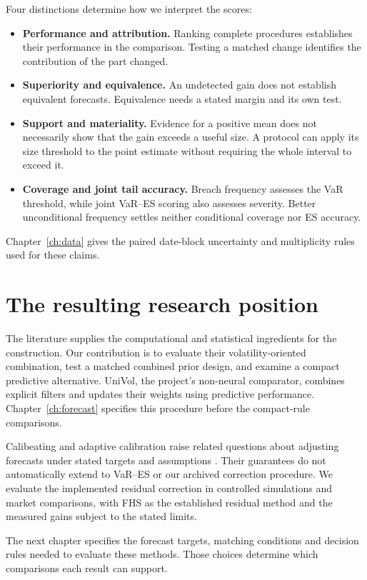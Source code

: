 Four distinctions determine how we interpret the scores:
\begin{itemize}
\item \textbf{Performance and attribution.} Ranking complete procedures establishes their performance in the comparison. Testing a matched change identifies the contribution of the part changed.
\item \textbf{Superiority and equivalence.} An undetected gain does not establish equivalent forecasts. Equivalence needs a stated margin and its own test.
\item \textbf{Support and materiality.} Evidence for a positive mean does not necessarily show that the gain exceeds a useful size. A protocol can apply its size threshold to the point estimate without requiring the whole interval to exceed it.
\item \textbf{Coverage and joint tail accuracy.} Breach frequency assesses the VaR threshold, while joint VaR--ES scoring also assesses severity. Better unconditional frequency settles neither conditional coverage nor ES accuracy.
\end{itemize}
Chapter~\ref{ch:data} gives the paired date-block uncertainty and multiplicity rules used for these claims.

\section{The resulting research position}

The literature supplies the computational and statistical ingredients for the construction. Our contribution is to evaluate their volatility-oriented combination, test a matched combined prior design, and examine a compact predictive alternative. UniVol, the project's non-neural comparator, combines explicit filters and updates their weights using predictive performance. Chapter~\ref{ch:forecast} specifies this procedure before the compact-rule comparisons.

Calibeating and adaptive calibration raise related questions about adjusting forecasts under stated targets and assumptions \citep{foster2023calibeating,gibbs2021adaptive}. Their guarantees do not automatically extend to VaR--ES or our archived correction procedure. We evaluate the implemented residual correction in controlled simulations and market comparisons, with FHS as the established residual method and the measured gains subject to the stated limits.

The next chapter specifies the forecast targets, matching conditions and decision rules needed to evaluate these methods. Those choices determine which comparisons each result can support.
